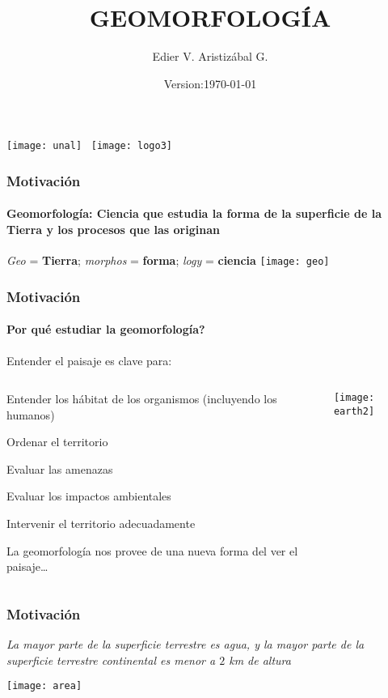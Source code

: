 \documentclass[12pt]{beamer}
\title[Introducción]{GEOMORFOLOGÍA}
\author[Edier Aristizábal]{Edier V. Aristizábal G.}
\institute{\emph{evaristizabalg@unal.edu.co}}
\date{Version:\today}
\begin{document}
\begin{frame}
\titlepage
\centering
\texttt{[image: unal]}\hspace*{4.75cm}~%
\texttt{[image: logo3]} 
\end{frame}
\begin{frame}
\frametitle{Motivación}
\framesubtitle{\textbf{Geomorfología}: Ciencia que estudia la forma de la superficie de la Tierra y los procesos que las originan}
\emph{Geo} = \textbf{Tierra}; \emph{morphos} = \textbf{forma}; \emph{logy} = \textbf{ciencia}
\centering
\texttt{[image: geo]}
\end{frame}
\begin{frame}
\frametitle{Motivación}
\framesubtitle{Por qué estudiar la geomorfología?}
Entender el paisaje es clave para:
\begin{columns}
		\begin{column}{.3\linewidth}
\begin{itemize}
\small{
\item Entender los hábitat de los organismos (incluyendo los humanos)
\item Ordenar el territorio
\item Evaluar las amenazas
\item Evaluar los impactos ambientales
\item Intervenir el territorio adecuadamente
\item La geomorfología nos provee de una nueva forma del ver el paisaje…}
\end{itemize}
		\end{column}
		\begin{column}{.7\linewidth}
		\begin{center}
		\texttt{[image: earth2]}
		\end{center}
		\end{column}
	\end{columns}
\end{frame}
\begin{frame}
\frametitle{Motivación}
\small{\emph{La mayor parte de la superficie terrestre es agua, y la mayor parte de la superficie terrestre continental es menor a $2$ km de altura}}
\begin{center}
\texttt{[image: area]}
\end{center}
\end{frame}
\end{document}
